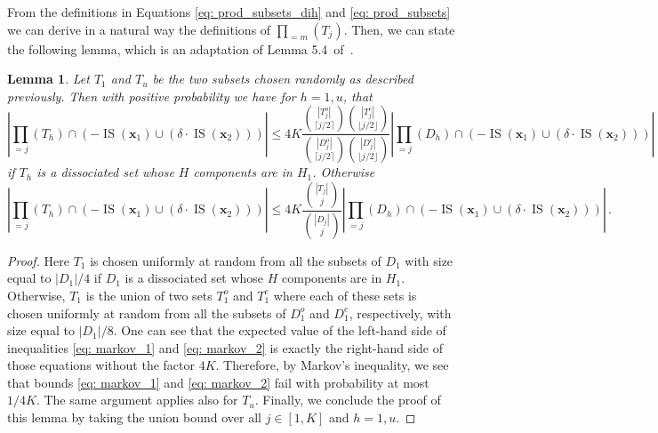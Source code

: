 \documentclass[11pt]{amsart}
\newtheorem{lemma}[theorem]{Lemma}
\theoremstyle{definition}
\DeclareMathOperator{\IS}{IS}
\begin{document}
From the definitions in Equations \eqref{eq: prod_subsets_dih} and \eqref{eq: prod_subsets} we can derive in a natural way the definitions of $\prod_{=m} (T_j)$. Then, we can state the following lemma, which is an adaptation of Lemma 5.4~of~\cite{BK}.

\begin{lemma}\label{lem: adapt-5.4}
Let $T_1$ and $T_u$ be the two subsets chosen randomly as described previously. Then with positive probability we have for $h = 1, u$, that
\begin{equation}\label{eq: markov_1}
\left|\prod_{=j} (T_h) \cap \left( -\IS(\mathbf{x}_1) \cup \left(\delta \cdot \IS(\mathbf{x}_2)\right) \right)\right| \leq 4K \frac{\binom{|T_j^o|}{\lceil j/2 \rceil}\binom{|T_j^e|}{\lfloor j/2 \rfloor}}{\binom{|D_j^o|}{\lceil j/2 \rceil} \binom{|D_j^e|}{\lfloor j/2 \rfloor}} \left|\prod_{=j} (D_h) \cap \left( -\IS(\mathbf{x}_1) \cup \left(\delta \cdot \IS(\mathbf{x}_2)\right) \right)\right|\,
\end{equation}
if $T_h$ is a dissociated set whose $H$ components are in $H_1$. Otherwise
\begin{equation}\label{eq: markov_2}
\left|\prod_{=j} (T_h) \cap \left( -\IS(\mathbf{x}_1) \cup \left(\delta \cdot \IS(\mathbf{x}_2)\right) \right)\right| \leq 4K \frac{\binom{|T_j|}{j}}{\binom{|D_j|}{j}}\left|\prod_{=j} (D_h) \cap \left( -\IS(\mathbf{x}_1) \cup \left(\delta \cdot \IS(\mathbf{x}_2)\right) \right)\right|\,.
\end{equation}
\end{lemma}
\begin{proof}
Here $T_1$ is chosen uniformly at random from all the subsets of $D_1$ with size equal to $|D_1|/4$ if $D_1$ is a dissociated set whose $H$ components are in $H_1$. Otherwise, $T_1$ is the union of two sets $T_1^o$ and $T_1^e$ where each of these sets is chosen uniformly at random from all the subsets of $D_1^o$ and $D_1^e$, respectively, with size equal to $|D_1|/8$. One can see that the expected value of the left-hand side of inequalities \eqref{eq: markov_1} and \eqref{eq: markov_2} is exactly the right-hand side of those equations without the factor $4K$. Therefore, by Markov's inequality, we see that bounds \eqref{eq: markov_1} and \eqref{eq: markov_2} fail with probability at most $1/4K$. The same argument applies also for $T_u$. Finally, we conclude the proof of this lemma by taking the union bound over all $j \in [1,K]$ and $h = 1,u$.
\end{proof}
\end{document}
